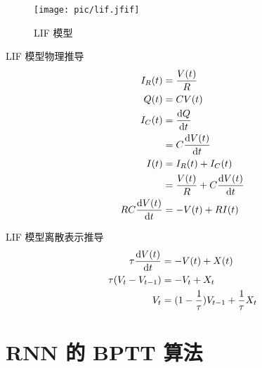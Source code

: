\documentclass{beamer}
\begin{document}
\begin{frame}
    \begin{figure}[l]
        \texttt{[image: pic/lif.jfif]}
        \caption{LIF 模型}
    \end{figure}
\end{frame}


\begin{frame}{LIF 模型物理推导}
    \begin{equation*}
        \begin{aligned}
            I_R(t)
            &= \frac{V(t)}{R} \\
            Q(t)
            &= CV(t) \\
            I_C(t)
            &= \frac{{\rm d}Q}{{\rm d}t} \\
            &= C\frac{{\rm d}V(t)}{{\rm d}t} \\
            I(t)
            &= I_R(t)+I_C(t) \\
            &= \frac{V(t)}{R} + C\frac{{\rm d}V(t)}{{\rm d}t} \\
            RC\frac{{\rm d}V(t)}{{\rm d}t}
            &= -V(t) + RI(t)
        \end{aligned}
    \end{equation*}
\end{frame}

\begin{frame}{LIF 模型离散表示推导}
    \begin{equation*}
        \begin{aligned}
            \tau\frac{{\rm d}V(t)}{{\rm d}t}
            &= -V(t)+X(t) \\
            \tau(V_t-V_{t-1})
            &= -V_t+X_t \\
            V_t
            &= (1-\frac{1}{\tau})V_{t-1}+\frac{1}{\tau} X_t
        \end{aligned}
    \end{equation*}
\end{frame}

\section{RNN 的 BPTT 算法}
\end{document}
